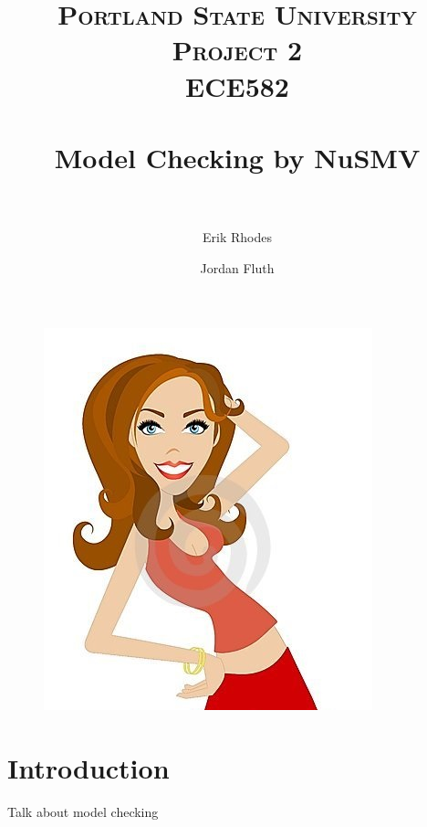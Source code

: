 \documentclass[11pt]{article}
\title{	
\normalfont \normalsize 
\textsc{\LARGE Portland State University}\\[1.5cm] %
\textsc{\Large Project 2}\\[0.5cm] %
\textsc{\large ECE582}\\[0.5cm] %
\horrule{1.2pt} \\[0.4cm] %
\huge Model Checking by NuSMV \\ %
\horrule{1.2pt} \\[0.5cm] %
}
\begin{document}
\raggedright
\author{Erik Rhodes \and Jordan Fluth} %
\maketitle %
\thispagestyle{empty}


\begin{figure}[h]\centering
\includegraphics[height=0.65\textwidth]{images/model.jpg}
		\label{LED}
	\end{figure}
	
\newpage

%
%



\section{Introduction} 
Talk about model checking


\end{document}

